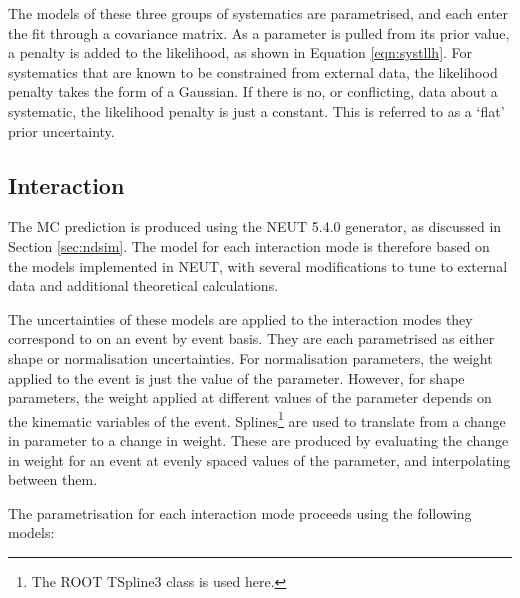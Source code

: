 The models of these three groups of systematics are parametrised, and each enter the fit through a covariance matrix. As a parameter is pulled from its prior value, a penalty is added to the likelihood, as shown in Equation \ref{eqn:systllh}. For systematics that are known to be constrained from external data, the likelihood penalty takes the form of a Gaussian. If there is no, or conflicting, data about a systematic, the likelihood penalty is just a constant. This is referred to as a `flat' prior uncertainty.

\subsection{Interaction}\label{sec:xsec}

The MC prediction is produced using the NEUT 5.4.0 generator\cite{neut}, as discussed in Section \ref{sec:ndsim}. The model for each interaction mode is therefore based on the models implemented in NEUT, with several modifications to tune to external data and additional theoretical calculations.

The uncertainties of these models are applied to the interaction modes they correspond to on an event by event basis. They are each parametrised as either shape or normalisation uncertainties. For normalisation parameters, the weight applied to the event is just the value of the parameter. However, for shape parameters, the weight applied at different values of the parameter depends on the kinematic variables of the event. Splines\footnote{The ROOT TSpline3 class is used here.} are used to translate from a change in parameter to a change in weight. These are produced by evaluating the change in weight for an event at evenly spaced values of the parameter, and interpolating between them. 

The parametrisation for each interaction mode proceeds using the following models:

